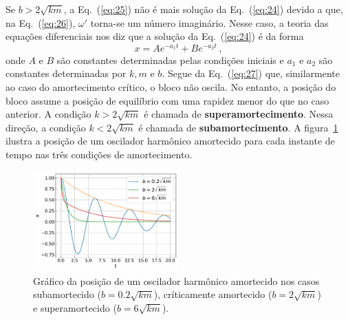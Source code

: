 \documentclass[12pt,a4paper]{article}
\theoremstyle{definition}
\begin{document}
Se $b>2\sqrt{km}$, a Eq.~(\ref{eq:25}) não é mais solução da
Eq.~(\ref{eq:24}) devido a que, na Eq.~(\ref{eq:26}), $\omega'$
torna-se um número imaginário. Nesse caso, a teoria das equações
diferenciais nos diz que a solução da Eq.~(\ref{eq:24}) é da forma
\begin{equation}
  \label{eq:27}
  x=Ae^{-a_1t}+Be^{-a_2t}\,,
\end{equation}
onde $A$ e $B$ são constantes determinadas pelas condições iniciais e
$a_1$ e $a_2$ são constantes determinadas por $k,m$ e $b$. Segue da
Eq.~(\ref{eq:27}) que, similarmente ao caso do amortecimento crítico,
o bloco não oscila. No entanto, a posição do bloco assume a posição de
equilíbrio com uma rapidez menor do que no caso anterior. A condição
$k>2\sqrt{km}$ é chamada de \textbf{superamortecimento}. Nessa
direção, a condição $k<2\sqrt{km}$ é chamada de
\textbf{subamortecimento}. A figura~\ref{fig:osciladoramortecido}
ilustra a posição de um oscilador harmônico amortecido para cada
instante de tempo nas três condições de amortecimento.

\begin{figure}[ht]
  \centering
  \includegraphics[width=0.5\textwidth,keepaspectratio]{aux/osciladoramortecido.pdf}
  \caption{Gráfico da posição de um oscilador harmônico amortecido nos
    casos subamortecido ($b=0.2\sqrt{km}$), críticamente amortecido
    ($b=2\sqrt{km}$) e superamortecido ($b=6\sqrt{km}$).}
  \label{fig:osciladoramortecido}
\end{figure}
\end{document}
